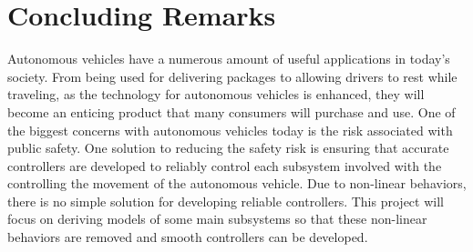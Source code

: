 \documentclass[letterpaper,12pt]{article}   %
\begin{document}

\section{Concluding Remarks}
Autonomous vehicles have a numerous amount of useful applications in today's society. From being used for delivering packages to allowing drivers to rest while traveling, as the technology for autonomous vehicles is enhanced, they will become an enticing product that many consumers will purchase and use. One of the biggest concerns with autonomous vehicles today is the risk associated with public safety. One solution to reducing the safety risk is ensuring that accurate controllers are developed to reliably control each subsystem involved with the controlling the movement of the autonomous vehicle. Due to non-linear behaviors, there is no simple solution for developing reliable controllers. This project will focus on deriving models of some main subsystems so that these non-linear behaviors are removed and smooth controllers can be developed.

\pagebreak


\end{document}
